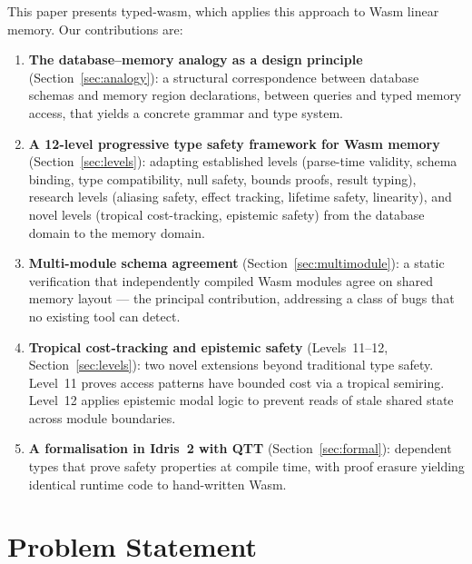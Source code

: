 \documentclass[sigplan,nonacm,screen]{acmart}
\begin{document}
This paper presents typed-wasm, which applies this approach to Wasm
linear memory. Our contributions are:

\begin{enumerate}
  \item \textbf{The database--memory analogy as a design principle}
    (Section~\ref{sec:analogy}): a structural correspondence between
    database schemas and memory region declarations, between queries and
    typed memory access, that yields a concrete grammar and type system.

  \item \textbf{A 12-level progressive type safety framework for Wasm memory}
    (Section~\ref{sec:levels}): adapting established levels (parse-time
    validity, schema binding, type compatibility, null safety, bounds proofs,
    result typing), research levels (aliasing safety, effect tracking,
    lifetime safety, linearity), and novel levels (tropical cost-tracking,
    epistemic safety) from the database domain to the memory domain.

  \item \textbf{Multi-module schema agreement} (Section~\ref{sec:multimodule}):
    a static verification that independently compiled Wasm modules agree on
    shared memory layout --- the principal contribution, addressing a class of
    bugs that no existing tool can detect.

  \item \textbf{Tropical cost-tracking and epistemic safety}
    (Levels~11--12, Section~\ref{sec:levels}): two novel extensions beyond
    traditional type safety. Level~11 proves access patterns have bounded
    cost via a tropical semiring. Level~12 applies epistemic modal logic to
    prevent reads of stale shared state across module boundaries.

  \item \textbf{A formalisation in Idris~2 with QTT}
    (Section~\ref{sec:formal}): dependent types that prove safety properties
    at compile time, with proof erasure yielding identical runtime code to
    hand-written Wasm.
\end{enumerate}

\section{Problem Statement}
\label{sec:problem}
\end{document}
